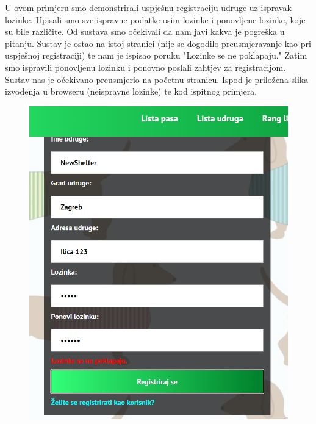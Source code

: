 		 U ovom primjeru smo demonstrirali uspješnu registraciju udruge uz ispravak lozinke. Upisali smo sve ispravne podatke osim lozinke i ponovljene lozinke, koje su bile različite. Od sustava smo očekivali da nam javi kakva je pogreška u pitanju. Sustav je ostao na istoj stranici (nije se dogodilo preusmjeravanje kao pri uspješnoj registraciji) te nam je ispisao poruku "Lozinke se ne poklapaju." Zatim smo ispravili ponovljenu lozinku i ponovno poslali zahtjev za registracijom. Sustav nas je očekivano preusmjerio na početnu stranicu. Ispod je priložena slika izvođenja u browseru (neispravne lozinke) te kod ispitnog primjera. 
			 
			  \begin{figure}[H]
			 	\includegraphics[scale=0.7]{slike/PasswordError.PNG}
			 	\centering
			 \end{figure}
